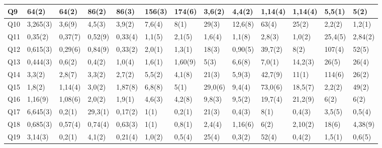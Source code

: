 \documentclass[12pt, letter paper]{report}
\begin{document}
\begin{landscape}
\begin{table}
\begin{threeparttable}
\begin{tabular}{| l | l | l | l | l | l | l | l | l | l | l | l | l |}
                Q9  & 64(2)    & 64(2)   & 86(2)   & 86(3)   & 156(3)       & 174(6)  & 3,6(2)\tnote{3}& 4,4(2)\tnote{3}& 1,14(4)\tnote{4}& 1,14(4)\tnote{4}& 5,5(1)\tnote{3} & 5(2)\tnote{4}   \\ \hline
                Q10 & 3,265(3) & 3,6(9)  & 4,5(3)  & 3,9(2)  & 7,6(4)       & 8(1)    & 29(3)          & 12,6(8)        & 63(4)           & 25(2)           & 2,2(2)\tnote{3} & 1,2(1)\tnote{3} \\ \hline
                Q11 & 0,35(2)  & 0,37(7) & 0,52(9) & 0,33(4) & 1,1(5)       & 2,1(5)  & 1,6(4)         & 1,1(8)         & 2,8(3)          & 1,0(2)          & 25,4(5)         & 2,84(2)         \\ \hline
                Q12 & 0,615(3) & 0,29(6) & 0,84(9) & 0,33(2) & 2,0(1)       & 1,3(1)  & 18(3)          & 0,90(5)        & 39,7(2)         & 8(2)            & 107(4)          & 52(5)           \\ \hline
                Q13 & 0,444(3) & 0,6(2)  & 0,4(2)  & 1,0(4)  & 1,6(1)       & 1,60(9) & 5(3)           & 6,6(8)         & 7,0(1)          & 14,2(3)         & 26(5)           & 26(4)           \\ \hline
                Q14 & 3,3(2)   & 2,8(7)  & 3,3(2)  & 2,7(2)  & 5,5(2)       & 4,1(8)  & 21(3)          & 5,9(3)         & 42,7(9)         & 11(1)           & 114(6)          & 26(2)           \\ \hline
                Q15 & 1,8(2)   & 1,14(4) & 3,0(2)  & 1,87(8) & 6,8(8)       & 5(1)    & 29,0(6)        & 9,4(4)         & 73,0(6)         & 18,5(7)         & 2,2(2)\tnote{3} & 49(2)           \\ \hline
                Q16 & 1,16(9)  & 1,08(6) & 2,0(2)  & 1,9(1)  & 4,6(3)       & 4,2(8)  & 9,8(3)         & 9,5(2)         & 19,7(4)         & 21,2(9)         & 6(2)\tnote{2}   & 6(2)\tnote{2}   \\ \hline
                Q17 & 6,645(3) & 0,2(1)  & 29,3(1) & 0,17(2) & 1(1)\tnote{3}& 0,2(1)  & 21(3)          & 0,4(3)         & 8(1)\tnote{2}   & 0,4(3)          & 3,5(5)\tnote{3} & 0,5(4)          \\ \hline
                Q18 & 0,685(3) & 0,57(4) & 0,74(4) & 0,63(3) & 1(1)\tnote{3}& 0,8(1)  & 2,4(4)         & 1,16(6)        & 6(2)            & 2,10(2)         & 18(6)           & 4,38(9)         \\ \hline
                Q19 & 3,14(3)  & 0,2(1)  & 4,1(2)  & 0,21(4) & 1,0(2)       & 0,5(4)  & 25(4)          & 0,3(2)         & 52(4)           & 0,4(2)          & 1,5(1)\tnote{3} & 0,6(5)          \\ \hline

\end{tabular}
\end{threeparttable}
\end{table}
\end{landscape}
\end{document}
